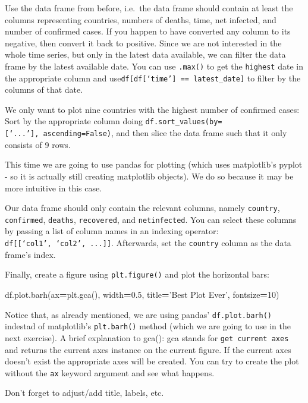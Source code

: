 \documentclass[
  11pt,
]{article}
\newenvironment{Shaded}{\begin{snugshade}}{\end{snugshade}}
\newcommand{\DecValTok}[1]{\textcolor[rgb]{0.00,0.00,0.81}{#1}}
\newcommand{\FloatTok}[1]{\textcolor[rgb]{0.00,0.00,0.81}{#1}}
\newcommand{\NormalTok}[1]{#1}
\newcommand{\OperatorTok}[1]{\textcolor[rgb]{0.81,0.36,0.00}{\textbf{#1}}}
\newenvironment{tipsp}[1]
  {
  \begin{itemize}
  \footnotesize
  \renewcommand{\labelitemi}{
    \raisebox{-.7\height}[0pt][0pt]{
      {\setkeys{Gin}{width=3em,keepaspectratio}
        \texttt{[image: images/\#1.png]}}
    }
  }
  \setlength{\fboxsep}{1em}
  \begin{pbox}
  \item
  }
  {
  \end{pbox}
  \end{itemize}
  }
\begin{document}
\begin{tipsp}p

Use the data frame from before, i.e.~the data frame should contain at least the columns representing countries, numbers of deaths, time, net infected, and number of confirmed cases.
If you happen to have converted any column to its negative, then convert it back to positive.
Since we are not interested in the whole time series, but only in the latest data available, we can filter the data frame by the latest available date. You can use \texttt{.max()} to get the \texttt{highest} date in the appropriate column and use\texttt{df{[}df{[}‘time’{]}\ ==\ latest\_date{]}} to filter by the columns of that date.

We only want to plot nine countries with the highest number of confirmed cases: Sort by the appropriate column doing \texttt{df.sort\_values(by={[}‘...’{]},\ ascending=False)}, and then slice the data frame such that it only consists of 9 rows.

This time we are going to use pandas for plotting (which uses matplotlib's pyplot - so it is actually still creating matplotlib objects). We do so because it may be more intuitive in this case.

Our data frame should only contain the relevant columns, namely \texttt{country}, \texttt{confirmed}, \texttt{deaths}, \texttt{recovered}, and \texttt{netinfected}. You can select these columns by passing a list of column names in an indexing operator: \texttt{df{[}{[}‘col1’,\ ‘col2’,\ ...{]}{]}}. Afterwards, set the \texttt{country} column as the data frame's index.

Finally, create a figure using \texttt{plt.figure()} and plot the horizontal bars:

\begin{Shaded}
\begin{Highlighting}[]
\NormalTok{df.plot.barh(ax}\OperatorTok{=}\NormalTok{plt.gca(), width}\OperatorTok{=}\FloatTok{0.5}\NormalTok{, title}\OperatorTok{=}\NormalTok{’Best Plot Ever’, fontsize}\OperatorTok{=}\DecValTok{10}\NormalTok{)}
\end{Highlighting}
\end{Shaded}

Notice that, as already mentioned, we are using pandas' \texttt{df.plot.barh()} indestad of matplotlib's \texttt{plt.barh()} method (which we are going to use in the next exercise).
A brief explanation to gca(): gca stands for \texttt{get\ current\ axes} and returns the current axes instance on the current figure. If the current axes doesn't exist the appropriate axes will be created. You can try to create the plot without the \texttt{ax} keyword argument and see what happens.

Don't forget to adjust/add title, labels, etc.

\end{tipsp}
\end{document}
